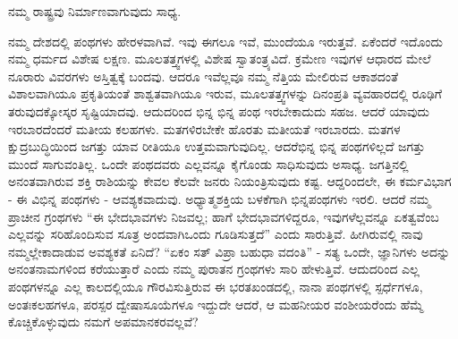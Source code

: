 ನಮ್ಮ ರಾಷ್ಟ್ರವು ನಿರ್ಮಾಣವಾಗುವುದು ಸಾಧ್ಯ.

ನಮ್ಮ ದೇಶದಲ್ಲಿ ಪಂಥಗಳು ಹೇರಳವಾಗಿವೆ. ಇವು ಈಗಲೂ ಇವೆ, ಮುಂದೆಯೂ ಇರುತ್ತವೆ. ಏಕೆಂದರೆ ಇದೊಂದು ನಮ್ಮ ಧರ್ಮದ ವಿಶೇಷ ಲಕ್ಷಣ. ಮೂಲತತ್ತ್ವಗಳಲ್ಲಿ ವಿಶೇಷ ಸ್ವಾತಂತ್ರ್ಯವಿದೆ. ಕ್ರಮೇಣ ಇವುಗಳ ಆಧಾರದ ಮೇಲೆ ನೂರಾರು ವಿವರಗಳು ಅಸ್ತಿತ್ವಕ್ಕೆ ಬಂದವು. ಆದರೂ ಇವೆಲ್ಲವೂ ನಮ್ಮ ನೆತ್ತಿಯ ಮೇಲಿರುವ ಆಕಾಶದಂತೆ ವಿಶಾಲವಾಗಿಯೂ ಪ್ರಕೃತಿಯಂತೆ ಶಾಶ್ವತವಾಗಿಯೂ ಇರುವ, ಮೂಲತತ್ತ್ವಗಳನ್ನು ದಿನಂಪ್ರತಿ ವ್ಯವಹಾರದಲ್ಲಿ ರೂಢಿಗೆ ತರುವುದಕ್ಕೋಸ್ಕರ ಸೃಷ್ಟಿಯಾದವು. ಆದುದರಿಂದ ಭಿನ್ನ ಭಿನ್ನ ಪಂಥ ಇರಬೇಕಾದುದು ಸಹಜ. ಆದರೆ ಯಾವುದು ಇರಬಾರದೆಂದರೆ ಮತೀಯ ಕಲಹಗಳು. ಮತಗಳಿರಬೇಕೇ ಹೊರತು ಮತೀಯತೆ ಇರಬಾರದು. ಮತಗಳ ಕ್ಷುದ್ರಬುದ್ಧಿಯಿಂದ ಜಗತ್ತು ಯಾವ ರೀತಿಯೂ ಉತ್ತಮವಾಗುವುದಿಲ್ಲ. ಆದರೆ\break ಭಿನ್ನ ಭಿನ್ನ ಪಂಥಗಳಿಲ್ಲದೆ ಜಗತ್ತು ಮುಂದೆ ಸಾಗುವಂತಿಲ್ಲ. ಒಂದೇ ಪಂಥ\-ದವರು ಎಲ್ಲವನ್ನೂ ಕೈಗೊಂಡು ಸಾಧಿಸುವುದು ಅಸಾಧ್ಯ. ಜಗತ್ತಿನಲ್ಲಿ ಅನಂತವಾಗಿರುವ ಶಕ್ತಿ ರಾಶಿಯನ್ನು ಕೇವಲ ಕೆಲವೇ ಜನರು ನಿಯಂತ್ರಿಸುವುದು ಕಷ್ಟ. ಆದ್ದರಿಂದಲೇ, ಈ ಕರ್ಮವಿಭಾಗ - ಈ ವಿಭಿನ್ನ ಪಂಥಗಳು - ಆವಶ್ಯಕವಾದುವು. ಅಧ್ಯಾತ್ಮಶಕ್ತಿಯ ಬಳಕೆಗಾಗಿ ಭಿನ್ನಪಂಥಗಳು ಇರಲಿ. ಆದರೆ ನಮ್ಮ ಪ್ರಾಚೀನ ಗ್ರಂಥಗಳು “ಈ ಭೇದಭಾವಗಳು ನಿಜವಲ್ಲ; ಹಾಗೆ ಭೇದಭಾವಗಳಿದ್ದರೂ, ಇವುಗಳೆಲ್ಲವನ್ನೂ ಏಕತ್ವವೆಂಬ ಎಲ್ಲವನ್ನು ಸರಿಹೊಂದಿಸುವ ಸೂತ್ರ ಅಂದವಾಗಿ\break ಒಂದು ಗೂಡಿಸುತ್ತದೆ” ಎಂದು ಸಾರುತ್ತಿವೆ. ಹೀಗಿರುವಲ್ಲಿ ನಾವು ನಮ್ಮಲ್ಲೇ\break ಕಾದಾಡುವ ಅವಶ್ಯಕತೆ ಏನಿದೆ? “ಏಕಂ ಸತ್​ ವಿಪ್ರಾ ಬಹುಧಾ ವದಂತಿ” - ಸತ್ಯ ಒಂದೇ, ಜ್ಞಾನಿಗಳು ಅದನ್ನು ಅನಂತನಾಮಗಳಿಂದ ಕರೆಯುತ್ತಾರೆ ಎಂದು ನಮ್ಮ ಪುರಾತನ ಗ್ರಂಥಗಳು ಸಾರಿ ಹೇಳುತ್ತಿವೆ. ಆದುದರಿಂದ ಎಲ್ಲ ಪಂಥಗಳನ್ನೂ ಎಲ್ಲ ಕಾಲದಲ್ಲಿಯೂ ಗೌರವಿಸುತ್ತಿರುವ ಈ ಭರತಖಂಡದಲ್ಲಿ, ನಾನಾ ಪಂಥಗಳಲ್ಲಿ ಸ್ಪರ್ಧೆಗಳೂ, ಅಂತಃಕಲಹಗಳೂ, ಪರಸ್ಪರ ದ್ವೇಷಾಸೂಯೆಗಳೂ ಇದ್ದುದೇ ಆದರೆ, ಆ ಮಹನೀಯರ ವಂಶೀಯರೆಂದು ಹೆಮ್ಮೆ ಕೊಚ್ಚಿಕೊಳ್ಳುವುದು ನಮಗೆ ಅಪಮಾನಕರವಲ್ಲವೆ?

